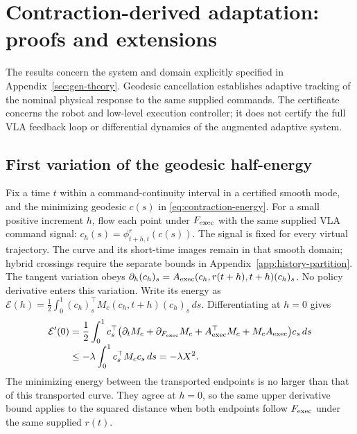 \section{Contraction-derived adaptation: proofs and extensions}
\label{app:adaptive}\label{app:composite}
The results concern the system and domain explicitly specified in
Appendix~\ref{sec:gen-theory}. Geodesic cancellation establishes adaptive
tracking of the nominal physical response to the same supplied commands.
The certificate concerns the robot and low-level execution controller;
it does not certify the full VLA feedback loop or differential dynamics
of the augmented adaptive system.

\subsection{First variation of the geodesic half-energy}
\label{app:first-variation}
Fix a time $t$ within a command-continuity interval in a certified smooth
mode, and the minimizing geodesic $c(s)$ in
\eqref{eq:contraction-energy}. For a small positive increment $h$, flow
each point under $F_{\rm exec}$ with the same supplied VLA command signal:
$c_h(s)=\phi^r_{t+h,t}(c(s))$. The signal is fixed for every virtual
trajectory. The curve and its short-time images remain in that smooth
domain; hybrid crossings require the separate bounds in
Appendix~\ref{app:history-partition}. The tangent variation obeys
$\partial_h(c_h)_s=A_{\rm exec}(c_h,r(t+h),t+h)(c_h)_s$.
No policy derivative enters this variation. Write its energy as
$\mathcal E(h)=\frac12\int_0^1(c_h)_s^\top M_c(c_h,t+h)(c_h)_s\,ds$.
Differentiating at $h=0$ gives
\begin{align}
 \mathcal E'(0)&=\frac12\int_0^1c_s^\top
 \big(\partial_tM_c+\partial_{F_{\rm exec}}M_c+A_{\rm exec}^\top M_c+M_cA_{\rm exec}\big)c_s\,ds
 \nonumber\\[-1mm]
 &\le-\lambda\int_0^1c_s^\top M_cc_s\,ds
 =-\lambda X^2.
 \label{eq:geodesic-nominal-proof}
\end{align}
The minimizing energy between the transported endpoints is no larger
than that of this transported curve. They agree at $h=0$, so the same
upper derivative bound applies to the squared distance when both
endpoints follow $F_{\rm exec}$ under the same supplied $r(t)$.

